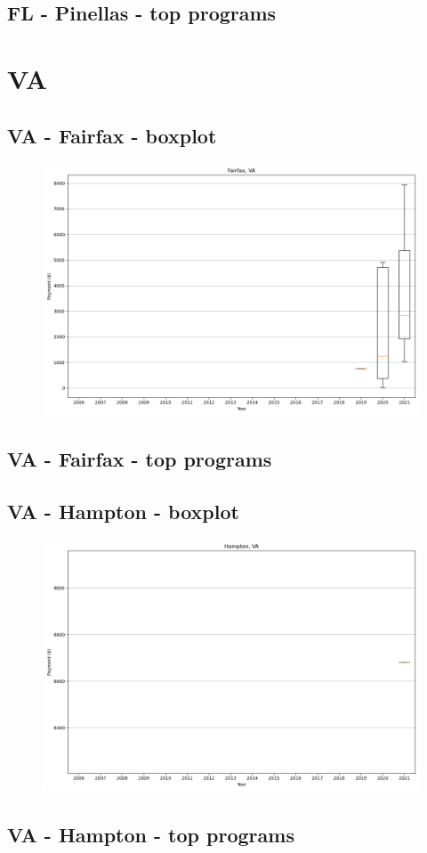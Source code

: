 \subsection*{FL - Pinellas - top programs}

\newpage
\section*{VA}
\subsection*{VA - Fairfax - boxplot}
\begin{figure}[h]
\centering
\includegraphics[width=7in]{../output/boxplots/counties/Fairfax-VA_boxplot.png}
\end{figure}


\subsection*{VA - Fairfax - top programs}

\newpage
\subsection*{VA - Hampton - boxplot}
\begin{figure}[h]
\centering
\includegraphics[width=7in]{../output/boxplots/counties/Hampton-VA_boxplot.png}
\end{figure}


\subsection*{VA - Hampton - top programs}

\newpage
